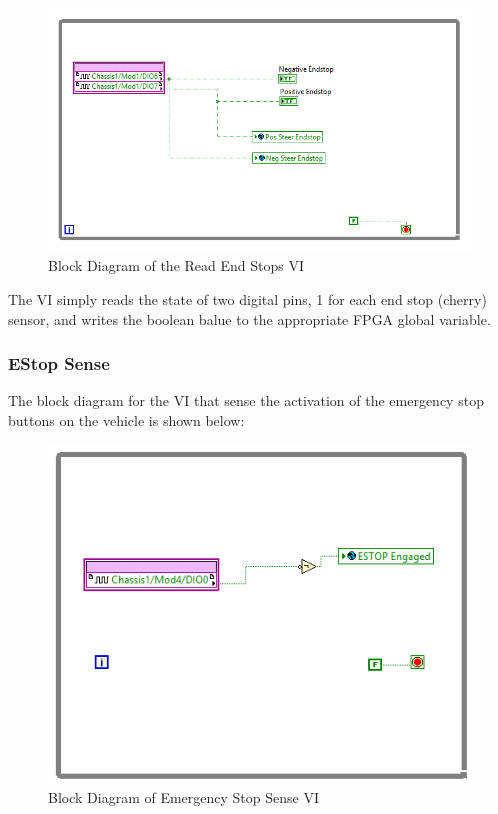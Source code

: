 \begin{figure}[h!]
\centering
\includegraphics[scale=0.75]{Photos/ReadEndStops.png}
\caption{Block Diagram of the Read End Stops VI}
\label{fig:readendstops}
\end{figure}

\noindent The VI simply reads the state of two digital pins, 1 for each end stop (cherry) sensor, and writes the boolean balue to the appropriate FPGA global variable. 

\newpage

\subsubsection{EStop Sense}

The block diagram for the VI that sense the activation of the emergency stop buttons on the vehicle is shown below:

\begin{figure}[h!]
\centering
\includegraphics[scale=0.75]{Photos/estopsense.png}
\caption{Block Diagram of Emergency Stop Sense VI}
\label{fig:estopsense}
\end{figure}

